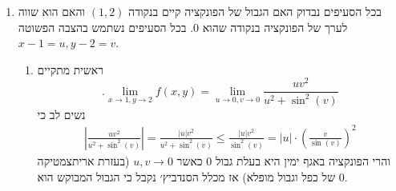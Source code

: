\documentclass[12pt, a4paper]{article}
\begin{document}
\begin{enumerate}
\begin{enumerate}
פתרון חדש: ראשית נשתמש בחוקי הלוגריתם
$$f(x,y)=2x\ln(\sqrt{x^2+3y^2})$$
ועכשיו ננסה ליישם את הטריק שהתחלנו ממנו, ולשמחתנו זה יעבוד:
$$f(x, y)= 2\sqrt{x^2+3y^2}\cdot\ln(\sqrt{x^2 + 3y^2})\cdot\frac{x}{\sqrt{x^2+3y^2}}$$
והרי הפעם מתקיים
$$ \left|\frac{x}{\sqrt{x^2+3y^2}}\right|\le
\frac{|x|}{\sqrt{x^2}}=1$$
אז האחרונה היא פונקציה חסומה כאשר האחרת
מקיימת
$$.\underset{x\to0,y\to0}{\lim}\sqrt{x^2+3y^2}\cdot\ln(\sqrt{x^2+3y^2})=0$$
אז ממשפט אפסה כפול חסומה נסיק כי הגבול שלנו שווה
$0$.\\
\item 
בניגוד לסעיף (ד) פונקציה זו כן רציפה בנקודה
$(0,0)$.
יש יותר מדרך אחת להראות זאת, למשל עם היינה, אך הדרך הקצרה ביותר היא הבאה:

לכל
$(x,y)\in\rr^2$
מתקיים
$|f(x,y)|\le |x|$
(למה? הפרידו לשני מקרים: אם
$(x,y)\in\qq^2$
או שלא, ובדקו זאת לכל מקרה)
ואז מכלל הסנדביץ׳ סיימנו.
\end{enumerate}

\item

בכל הסעיפים נבדוק האם הגבול של הפונקציה קיים בנקודה
$(1,2)$
והאם הוא שווה לערך של הפונקציה בנקודה שהוא 
$0$.
בכל הסעיפים נשתמש בהצבה הפשוטה
$x-1=u, y-2=v$.
\begin{enumerate}
\item 
ראשית מתקיים
$$.\underset{x\to 1,y\to 2}{\lim}f(x,y)=
\underset{u\to 0,v\to 0}{\lim}
\frac{uv^2}{u^2+\sin^2(v)}$$
נשים לב כי
\begin{align*}
    \left|\frac{uv^2}{u^2+\sin^2(v)}\right|
    =
    \frac{|u|v^2}{u^2+\sin^2(v)}
    \le
    \frac{|u|v^2}{\sin^2(v)}=|u|\cdot\left(
\frac{v}{\sin(v)}
    \right)^2
\end{align*}
והרי הפונקציה באגף ימין היא בעלת גבול
$0$
כאשר
$u,v\to 0$
(בעזרת אריתצמטיקה של כפל וגבול מופלא)
אז מכלל הסנדביץ׳ נקבל כי הגבול המבוקש הוא
$0$.



\end{enumerate}
\end{enumerate}
\end{document}
